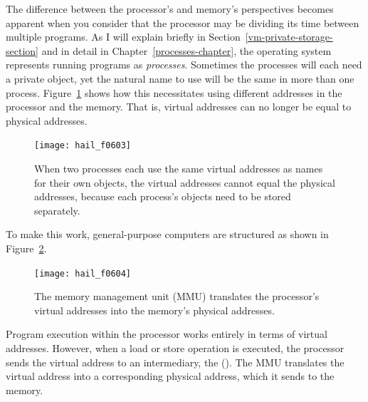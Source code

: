The difference between the processor's and memory's perspectives becomes apparent when you consider that
the processor may be dividing its time between multiple programs.
As I will explain briefly in Section~\ref{vm-private-storage-section}
and in detail in Chapter~\ref{processes-chapter}, the operating system
represents running programs as \emph{processes}.
Sometimes the processes will each need a private object,
yet the natural name to use will be the same in more than one process.
Figure~\ref{scan-6-2} shows how this necessitates using different
addresses in the processor and the memory.  That is, virtual addresses
can no longer be equal to physical addresses.
\begin{figure}
\centerline{\texttt{[image: hail\_f0603]}}
\caption{When two processes each use the same virtual
  addresses as names for their own objects, the virtual addresses
  cannot equal the physical addresses, because each process's objects
  need to be stored separately.}
\label{scan-6-2}
\end{figure}
To make this work, general-purpose computers are
structured as shown in Figure~\ref{PMM-diagram}.
\begin{figure}
\centerline{\texttt{[image: hail\_f0604]}}

\caption{The memory management unit (MMU) translates the processor's virtual
  addresses into the memory's physical addresses.}
\label{PMM-diagram}
\end{figure}
Program execution within the processor works entirely in terms of
virtual addresses.  However, when a load or store operation is
executed, the processor sends the virtual address to an intermediary,
the  ().  The MMU translates
the virtual address into a corresponding physical address, which it
sends to the memory.

